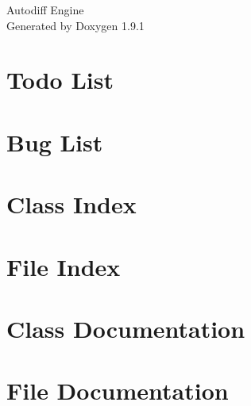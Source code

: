 \let\mypdfximage\pdfximage\def\pdfximage{\immediate\mypdfximage}\documentclass[twoside]{book}
\newcommand{\+}{\discretionary{\mbox{\scriptsize$\hookleftarrow$}}{}{}}
\newcommand{\clearemptydoublepage}{%
  \newpage{\pagestyle{empty}\cleardoublepage}%
}
\begin{document}
\raggedbottom

\hypersetup{pageanchor=false,
             bookmarksnumbered=true,
             pdfencoding=unicode
            }
\begin{titlepage}
\vspace*{7cm}
\begin{center}%
{\Large Autodiff Engine }\\
\vspace*{1cm}
{\large Generated by Doxygen 1.9.1}\\
\end{center}
\end{titlepage}
\clearemptydoublepage
{}
\tableofcontents
\clearemptydoublepage
{}
\hypersetup{pageanchor=true}

\chapter{Todo List}
\label{todo}

\chapter{Bug List}
\label{bug}

\chapter{Class Index}

\chapter{File Index}

\chapter{Class Documentation}

\chapter{File Documentation}







\backmatter
\newpage
{}
\clearemptydoublepage
{}
\printindex
\end{document}
